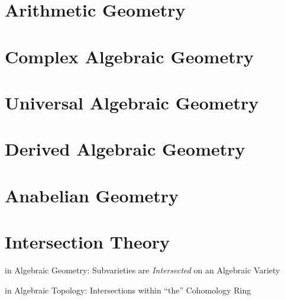 \section{Arithmetic Geometry}\label{sec:arithmetic_geometry}

\section{Complex Algebraic Geometry}
\label{sec:complex_algebraic_geometry}

\section{Universal Algebraic Geometry}\label{sec:universal_geometry}

\section{Derived Algebraic Geometry}
\label{sec:derived_algebraic_geometry}

\section{Anabelian Geometry}\label{sec:anabelian_geometry}

\section{Intersection Theory}\label{sec:intersection_theory}

in Algebraic Geometry: Subvarieties are \emph{Intersected} on an
Algebraic Variety

in Algebraic Topology: Intersections within ``the'' Cohomology Ring
